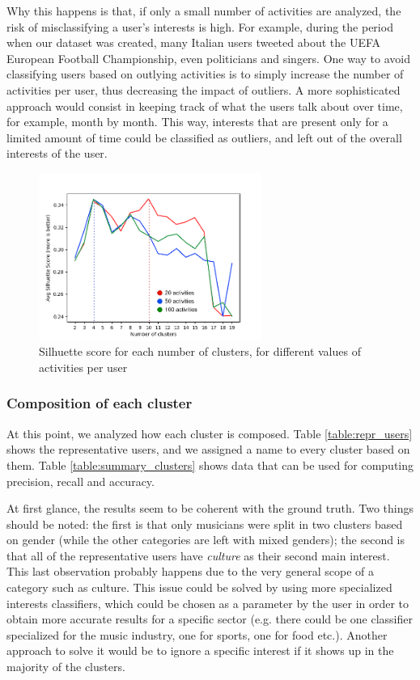 Why this happens is that, if only a small number of activities are analyzed, the risk of misclassifying a user’s interests is high. For example, during the period when our dataset was created, many Italian users tweeted about the UEFA European Football Championship, even politicians and singers. One way to avoid classifying users based on outlying activities is to simply increase the number of activities per user, thus decreasing the impact of outliers. A more sophisticated approach would consist in keeping track of what the users talk about over time, for example, month by month. This way, interests that are present only for a limited amount of time could be classified as outliers, and left out of the overall interests of the user.

\begin{figure}[h]
\centering
\includegraphics[width=0.65\textwidth]{img/Silhuette.png}
\caption{Silhuette score for each number of clusters, for different values of activities per user}
\label{fig:silhuette}
\end{figure}

\subsubsection{Composition of each cluster}
At this point, we analyzed how each cluster is composed. Table \ref{table:repr_users} shows the representative users, and we assigned a name to every cluster based on them. Table \ref{table:summary_clusters} shows data that can be used for computing precision, recall and accuracy.

At first glance, the results seem to be coherent with the ground truth. Two things should be noted: the first is that only musicians were split in two clusters based on gender (while the other categories are left with mixed genders); the second is that all of the representative users have \emph{culture} as their second main interest. This last observation probably happens due to the very general scope of a category such as culture. This issue could be solved by using more specialized interests classifiers, which could be chosen as a parameter by the user in order to obtain more accurate results for a specific sector (e.g. there could be one classifier specialized for the music industry, one for sports, one for food etc.). Another approach to solve it would be to ignore a specific interest if it shows up in the majority of the clusters.

